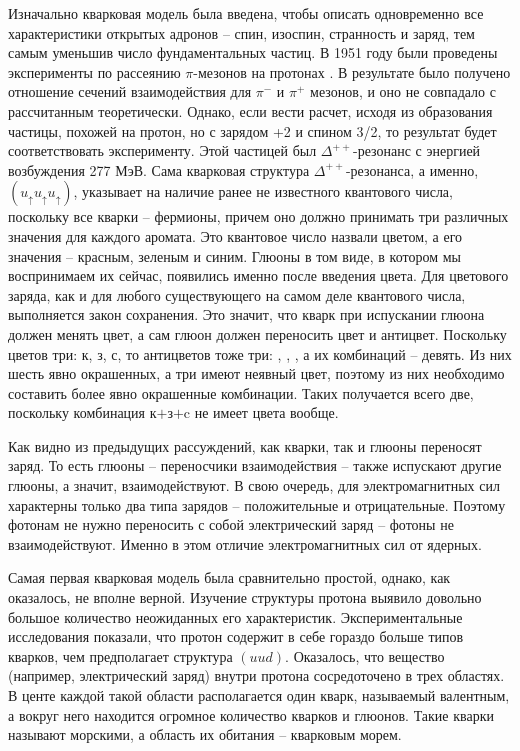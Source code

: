 \documentclass[12pt, a4paper]{article}
\begin{document}
Изначально кварковая модель была введена, чтобы описать одновременно все характеристики открытых адронов -- спин, изоспин, странность и заряд, тем самым уменьшив число фундаментальных частиц. В 1951 году были проведены эксперименты по рассеянию $\pi$-мезонов на протонах \cite{delta++}. В результате было получено отношение сечений взаимодействия для $\pi^-$ и $\pi^+$ мезонов, и оно не совпадало с рассчитанным теоретически. Однако, если вести расчет, исходя из образования частицы, похожей на протон, но с зарядом +2 и спином 3/2, то результат будет соответствовать эксперименту. Этой частицей был $\Delta^{++}$-резонанс с энергией возбуждения 277 МэВ. Сама кварковая структура $\Delta^{++}$-резонанса, а именно, $\left(u_\uparrow u_\uparrow u_\uparrow\right)$, указывает на наличие ранее не известного квантового числа, поскольку все кварки -- фермионы, причем оно должно принимать три различных значения для каждого аромата. Это квантовое число назвали цветом, а его значения -- красным, зеленым и синим. Глюоны в том виде, в котором мы воспринимаем их сейчас, появились именно после введения цвета. Для цветового заряда, как и для любого существующего на самом деле квантового числа, выполняется закон сохранения. Это значит, что кварк при испускании глюона должен менять цвет, а сам глюон должен переносить цвет и антицвет. Поскольку цветов три: к, з, с, то антицветов тоже три: , , , а их комбинаций -- девять. Из них шесть явно окрашенных, а три имеют неявный цвет, поэтому из них необходимо составить более явно окрашенные комбинации. Таких получается всего две, поскольку комбинация к$+$з$+$c не имеет цвета вообще. 

Как видно из предыдущих рассуждений, как кварки, так и глюоны переносят заряд. То есть глюоны -- переносчики взаимодействия -- также испускают другие глюоны, а значит, взаимодействуют. В свою очередь, для электромагнитных сил характерны только два типа зарядов -- положительные и отрицательные. Поэтому фотонам не нужно переносить с собой электрический заряд -- фотоны не взаимодействуют. Именно в этом отличие электромагнитных сил от ядерных.

Самая первая кварковая модель была сравнительно простой, однако, как оказалось, не вполне верной. Изучение структуры протона выявило довольно большое количество неожиданных его характеристик. Экспериментальные исследования \cite{DIS} показали, что протон содержит в себе гораздо больше типов кварков, чем предполагает структура $(uud)$. Оказалось, что вещество (например, электрический заряд) внутри протона сосредоточено в трех областях. В центе каждой такой области располагается один кварк, называемый валентным, а вокруг него находится огромное количество кварков и глюонов. Такие кварки называют морскими, а область их обитания -- кварковым морем.
\end{document}
